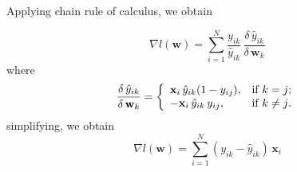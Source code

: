 \documentclass{article}
\newcommand{\mb}[1]{{\mathbf{#1}}}
\begin{document}
\begin{enumerate}
\begin{enumerate}
{ Applying chain rule of calculus, we obtain

\[
    \nabla l(\mb w) = \sum_{i=1}^{N} { \frac{y_{ik}}{\hat{y}_{ik}}\, \frac{\delta\,\hat{y}_{ik}}{\delta\, \mb{w}_k}}
\]
where
\[
    \frac{\delta\,\hat{y}_{ik}}{\delta\, \mb{w}_k} = \left\{
                                                       \begin{array}{ll}
                                                         \mathbf{x}_i\, \hat{y}_{ik} (1 - y_{ij}), & \hbox{if } k = j \hbox{;} \\
                                                         -\mathbf{x}_i\, \hat{y}_{ik}\,y_{ij}, & \hbox{if } k \ne j \hbox{.}
                                                       \end{array}
                                                     \right.
\]
simplifying, we obtain
\[
    \nabla l(\mb w) = \sum_{i=1}^{N} { \left(y_{ik} - \hat{y}_{ik}\right)\,\mathbf{x}_i }
\]

}
\end{enumerate}




\end{enumerate}
\end{document}
